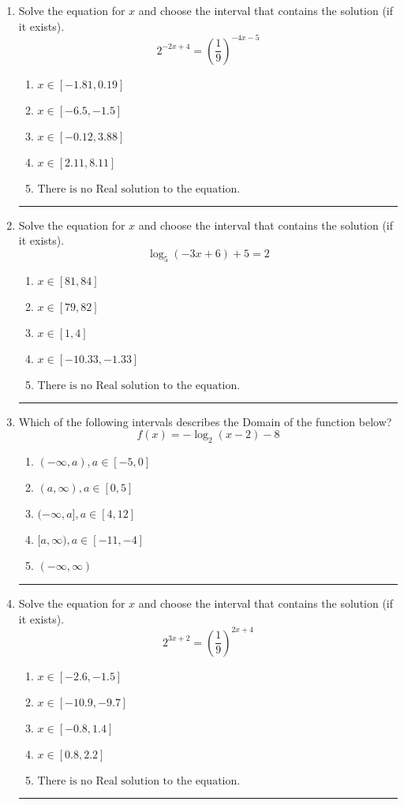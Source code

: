 \documentclass[14pt]{extbook}
\newcommand{\litem}[1]{\item#1\hspace*{-1cm}\rule{\textwidth}{0.4pt}}
\begin{document}
\begin{enumerate}
{\begin{enumerate}[label=\Alph*.]
\end{enumerate} }
\litem{
Solve the equation for $x$ and choose the interval that contains the solution (if it exists).\[ 2^{-2x+4} = \left(\frac{1}{9}\right)^{-4x-5} \]\begin{enumerate}[label=\Alph*.]
\item \( x \in [-1.81, 0.19] \)
\item \( x \in [-6.5, -1.5] \)
\item \( x \in [-0.12, 3.88] \)
\item \( x \in [2.11, 8.11] \)
\item \( \text{There is no Real solution to the equation.} \)

\end{enumerate} }
\litem{
Solve the equation for $x$ and choose the interval that contains the solution (if it exists).\[ \log_{5}{(-3x+6)}+5 = 2 \]\begin{enumerate}[label=\Alph*.]
\item \( x \in [81, 84] \)
\item \( x \in [79, 82] \)
\item \( x \in [1, 4] \)
\item \( x \in [-10.33, -1.33] \)
\item \( \text{There is no Real solution to the equation.} \)

\end{enumerate} }
\litem{
Which of the following intervals describes the Domain of the function below?\[ f(x) = -\log_2{(x-2)}-8 \]\begin{enumerate}[label=\Alph*.]
\item \( (-\infty, a), a \in [-5, 0] \)
\item \( (a, \infty), a \in [0, 5] \)
\item \( (-\infty, a], a \in [4, 12] \)
\item \( [a, \infty), a \in [-11, -4] \)
\item \( (-\infty, \infty) \)

\end{enumerate} }
\litem{
Solve the equation for $x$ and choose the interval that contains the solution (if it exists).\[ 2^{3x+2} = \left(\frac{1}{9}\right)^{2x+4} \]\begin{enumerate}[label=\Alph*.]
\item \( x \in [-2.6, -1.5] \)
\item \( x \in [-10.9, -9.7] \)
\item \( x \in [-0.8, 1.4] \)
\item \( x \in [0.8, 2.2] \)
\item \( \text{There is no Real solution to the equation.} \)


\end{enumerate}}
\end{enumerate}
\end{document}
